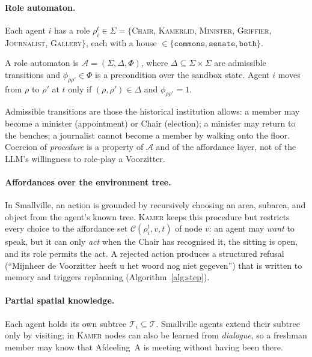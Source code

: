 \documentclass[sigconf,review,anonymous]{acmart}
\newcommand{\sys}{\textsc{Kamer}}
\begin{document}
\paragraph{Role automaton.} Each agent $i$ has a role
$\rho_i^t\in\Sigma=\{$\textsc{Chair}, \textsc{Kamerlid}, \textsc{Minister},
\textsc{Griffier}, \textsc{Journalist}, \textsc{Gallery}$\}$,
each with a house $\in\{\texttt{commons},\texttt{senate},\texttt{both}\}$.

\begin{definition}
A role automaton is $\mathcal{A}=(\Sigma,\Delta,\Phi)$, where
$\Delta\subseteq\Sigma\times\Sigma$ are admissible transitions and
$\phi_{\rho\rho'}\in\Phi$ is a precondition over the sandbox state. Agent
$i$ moves from $\rho$ to $\rho'$ at $t$ only if
$(\rho,\rho')\in\Delta$ and $\phi_{\rho\rho'}=1$.
\end{definition}

Admissible transitions are those the historical institution allows: a
member may become a minister (appointment) or Chair (election); a minister
may return to the benches; a journalist cannot become a member by walking
onto the floor. Coercion of \emph{procedure} is a property of $\mathcal{A}$
and of the affordance layer, not of the LLM's willingness to role-play a
Voorzitter.

\paragraph{Affordances over the environment tree.} In Smallville, an action
is grounded by recursively choosing an area, subarea, and object from the
agent's known tree. \sys{} keeps this procedure but restricts every choice
to the affordance set $\mathcal{C}(\rho_i^t,v,t)$ of node $v$: an agent may
\emph{want} to speak, but it can only \emph{act} when the Chair has
recognised it, the sitting is open, and its role permits the act. A
rejected action produces a structured refusal (``Mijnheer de Voorzitter
heeft u het woord nog niet gegeven'') that is written to memory and
triggers replanning (Algorithm~\ref{alg:step}).

\paragraph{Partial spatial knowledge.} Each agent holds its own subtree
$\mathcal{T}_i\subseteq\mathcal{T}$. Smallville agents extend their subtree
only by visiting; in \sys{} nodes can also be learned from \emph{dialogue},
so a freshman member may know that Afdeeling~A is meeting without having
been there.
\end{document}
